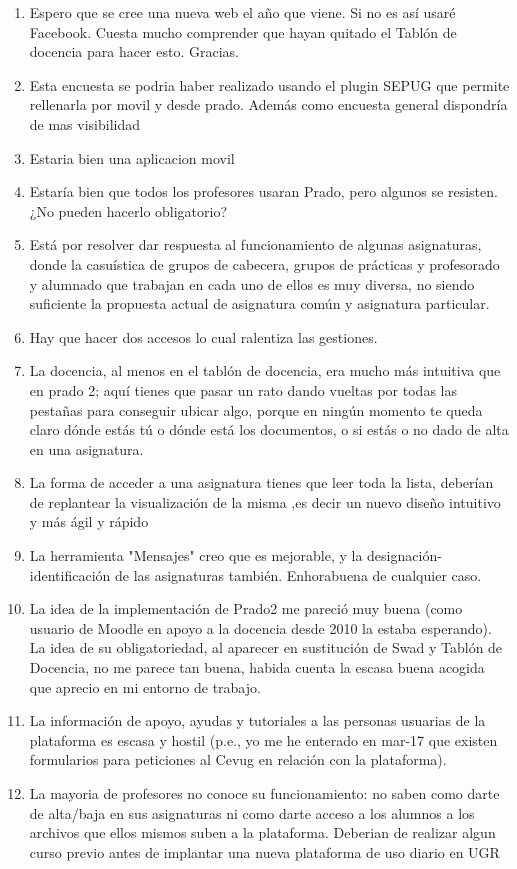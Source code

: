 \begin{enumerate}
\item Espero que se cree una nueva web el año que viene. Si no es así usaré Facebook. Cuesta mucho comprender que hayan quitado el Tablón de docencia para hacer esto. Gracias.
\item Esta encuesta se podria haber realizado usando el plugin SEPUG que permite rellenarla por movil y desde prado. Además como encuesta general dispondría de mas visibilidad
\item Estaria bien una aplicacion movil
\item Estaría bien que todos los profesores usaran Prado, pero algunos se resisten. ¿No pueden hacerlo obligatorio?
\item Está por resolver dar respuesta al funcionamiento de algunas asignaturas, donde la casuística de grupos de cabecera, grupos de prácticas y profesorado y alumnado que trabajan en cada uno de ellos es muy diversa, no siendo suficiente la propuesta actual de asignatura común y asignatura particular.
\item Hay que hacer dos accesos lo cual ralentiza las gestiones.
\item La docencia, al menos en el tablón de docencia, era mucho más intuitiva que en prado 2; aquí tienes que pasar un rato dando vueltas por todas las pestañas para conseguir ubicar algo, porque en ningún momento te queda claro dónde estás tú o dónde está los documentos, o si estás o no dado de alta en una asignatura.
\item La forma de acceder a una asignatura tienes que leer toda la lista, deberían de replantear la visualización de la misma ,es decir un nuevo diseño intuitivo y más ágil y rápido
\item La herramienta "Mensajes" creo que es mejorable, y la designación-identificación de las asignaturas también. Enhorabuena de cualquier caso.
\item La idea de la implementación de Prado2 me pareció muy buena (como usuario de Moodle en apoyo a la docencia desde 2010 la estaba esperando). La idea de su obligatoriedad, al aparecer en sustitución de Swad y Tablón de Docencia, no me parece tan buena, habida cuenta la escasa buena acogida que aprecio en mi entorno de trabajo.
\item La información de apoyo, ayudas y tutoriales a las personas usuarias de la plataforma es escasa y hostil (p.e., yo me he enterado en mar-17 que existen formularios para peticiones al Cevug en relación con la plataforma).
\item La mayoria de profesores no conoce su funcionamiento: no saben como darte de alta/baja en sus asignaturas ni como darte acceso a los alumnos a los archivos que ellos mismos suben a la plataforma. Deberian de realizar algun curso previo antes de implantar una nueva plataforma de uso diario en UGR

\end{enumerate}
